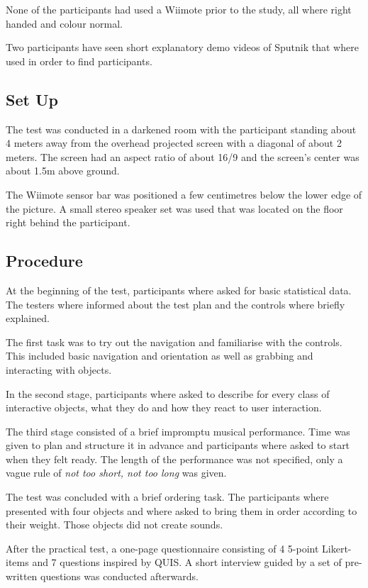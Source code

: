 \documentclass[10pt,a4paper]{scrartcl}
\begin{document}
None of the participants had used a Wiimote prior to the study, all where right handed and colour normal.

Two participants have seen short explanatory demo videos of Sputnik that where used in order to find participants.

\subsection{Set Up}
The test was conducted in a darkened room with the participant standing about 4 meters away from the overhead projected screen with a diagonal of about 2 meters. The screen had an aspect ratio of about 16/9 and the screen's center was about 1.5m above ground.

The Wiimote sensor bar was positioned a few centimetres below the lower edge of the picture. A small stereo speaker set was used that was located on the floor right behind the participant.

\subsection{Procedure}
At the beginning of the test, participants where asked for basic statistical data. The testers where informed about the test plan and the controls where briefly explained. 

The first task was to try out the navigation and familiarise with the controls. This included basic navigation and orientation as well as grabbing and interacting with objects. 

In the second stage, participants where asked to describe for every class of interactive objects, what they do and how they react to user interaction.

The third stage consisted of a brief impromptu musical performance. Time was given to plan and structure it in advance and participants where asked to start when they felt ready. The length of the performance was not specified, only a vague rule of \emph{not too short, not too long} was given.

The test was concluded with a brief ordering task. The participants where presented with four objects and where asked to bring them in order according to their weight. Those objects did not create sounds.

After the practical test, a one-page questionnaire consisting of 4 5-point Likert-items and 7 questions inspired by QUIS\cite{Chin1988}. A short interview guided by a set of pre-written questions was conducted afterwards.
\end{document}
